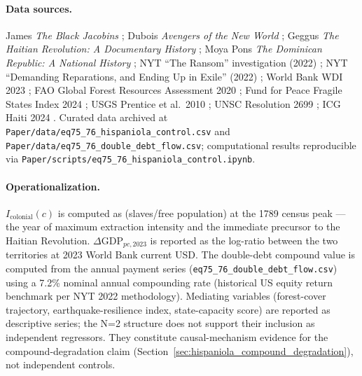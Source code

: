 \paragraph{Data sources.}
James \textit{The Black Jacobins} \cite{james_black_jacobins}; Dubois \textit{Avengers of the New World} \cite{dubois_avengers_new_world}; Geggus \textit{The Haitian Revolution: A Documentary History} \cite{geggus_haitian_revolution}; Moya Pons \textit{The Dominican Republic: A National History} \cite{moya_pons_dominican_republic}; NYT ``The Ransom'' investigation (2022) \cite{nyt_ransom2022}; NYT ``Demanding Reparations, and Ending Up in Exile'' (2022) \cite{nyt_aristide_coup_2022}; World Bank WDI 2023 \cite{world_bank_wdi_2023}; FAO Global Forest Resources Assessment 2020 \cite{fao_fra_2020}; Fund for Peace Fragile States Index 2024 \cite{fund_for_peace_fsi_2024}; USGS Prentice et al.\ 2010 \cite{usgs_enriquillo_fault}; UNSC Resolution 2699 \cite{unsc_res_2699_mss}; ICG Haiti 2024 \cite{icg_haiti_gangs_2024}. Curated data archived at \texttt{Paper/data/eq75\_76\_hispaniola\_control.csv} and \texttt{Paper/data/eq75\_76\_double\_debt\_flow.csv}; computational results reproducible via \texttt{Paper/scripts/eq75\_76\_hispaniola\_control.ipynb}.

\paragraph{Operationalization.}
$I_{\text{colonial}}(c)$ is computed as (slaves/free population) at the 1789 census peak --- the year of maximum extraction intensity and the immediate precursor to the Haitian Revolution. $\Delta\text{GDP}_{pc,2023}$ is reported as the log-ratio between the two territories at 2023 World Bank current USD. The double-debt compound value is computed from the annual payment series (\texttt{eq75\_76\_double\_debt\_flow.csv}) using a 7.2\% nominal annual compounding rate (historical US equity return benchmark per NYT 2022 methodology). Mediating variables (forest-cover trajectory, earthquake-resilience index, state-capacity score) are reported as descriptive series; the N=2 structure does not support their inclusion as independent regressors. They constitute causal-mechanism evidence for the compound-degradation claim (Section~\ref{sec:hispaniola_compound_degradation}), not independent controls.

